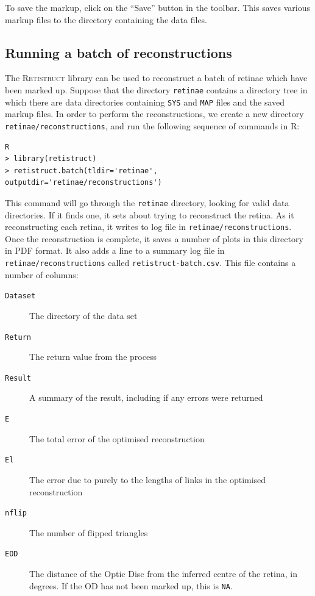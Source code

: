 \documentclass{article}
\begin{document}
To save the markup, click on the ``Save'' button in the toolbar. This
saves various markup files to the directory containing the data files.

\subsection{Running a batch of reconstructions}
\label{manual:sec:runn-batch-reconstr}

The \textsc{Retistruct} library can be used to reconstruct a batch of
retinae which have been marked up. Suppose that the directory
\texttt{retinae} contains a directory tree in which there are data
directories containing \texttt{SYS} and \texttt{MAP} files and the
saved markup files. In order to perform the reconstructions, we create
a new directory \texttt{retinae/reconstructions}, and run the
following sequence of commands in R:
\begin{verbatim}
R
> library(retistruct)
> retistruct.batch(tldir='retinae', outputdir='retinae/reconstructions')
\end{verbatim}
This command will go through the \texttt{retinae} directory, looking
for valid data directories. If it finds one, it sets about trying to
reconstruct the retina. As it reconstructing each retina, it writes to
log file in \texttt{retinae/reconstructions}. Once the reconstruction
is complete, it saves a number of plots in this directory in PDF
format. It also adds a line to a summary log file in
\texttt{retinae/reconstructions} called
\texttt{retistruct-batch.csv}. This file contains a number of columns:
\begin{description}
\item[\texttt{Dataset}] The directory of the data set
\item[\texttt{Return}] The return value from the process
\item[\texttt{Result}] A summary of the result, including if any
  errors were returned
\item[\texttt{E}] The total error  of the optimised reconstruction
\item[\texttt{El}] The error due to purely to the lengths of links in
  the optimised reconstruction
\item[\texttt{nflip}] The number of flipped triangles
\item[\texttt{EOD}] The distance of the Optic Disc from the inferred
  centre of the retina, in degrees. If the OD has not been marked up,
  this is \texttt{NA}.
\end{description}
\end{document}
